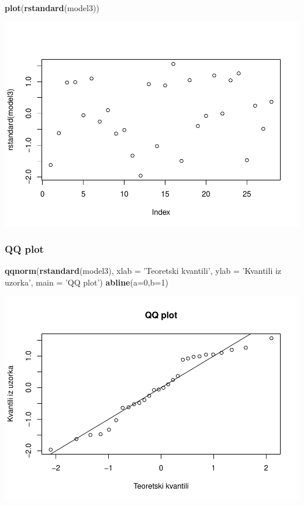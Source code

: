 \documentclass[]{article}
\newenvironment{Shaded}{\begin{snugshade}}{\end{snugshade}}
\newcommand{\KeywordTok}[1]{\textcolor[rgb]{0.13,0.29,0.53}{\textbf{{#1}}}}
\newcommand{\DataTypeTok}[1]{\textcolor[rgb]{0.13,0.29,0.53}{{#1}}}
\newcommand{\DecValTok}[1]{\textcolor[rgb]{0.00,0.00,0.81}{{#1}}}
\newcommand{\StringTok}[1]{\textcolor[rgb]{0.31,0.60,0.02}{{#1}}}
\newcommand{\NormalTok}[1]{{#1}}
\begin{document}
\begin{Shaded}
\begin{Highlighting}[]
\KeywordTok{plot}\NormalTok{(}\KeywordTok{rstandard}\NormalTok{(model3))}
\end{Highlighting}
\end{Shaded}

\includegraphics{Izvjestaj_files/figure-latex/unnamed-chunk-36-2.pdf}

\subsubsection{QQ plot}\label{qq-plot-3}

\begin{Shaded}
\begin{Highlighting}[]
\KeywordTok{qqnorm}\NormalTok{(}\KeywordTok{rstandard}\NormalTok{(model3), }\DataTypeTok{xlab =} \StringTok{'Teoretski kvantili'}\NormalTok{, }\DataTypeTok{ylab =} \StringTok{'Kvantili iz uzorka'}\NormalTok{,}
       \DataTypeTok{main =} \StringTok{'QQ plot'}\NormalTok{)}
\KeywordTok{abline}\NormalTok{(}\DataTypeTok{a=}\DecValTok{0}\NormalTok{,}\DataTypeTok{b=}\DecValTok{1}\NormalTok{)}
\end{Highlighting}
\end{Shaded}

\includegraphics{Izvjestaj_files/figure-latex/unnamed-chunk-37-1.pdf}
\end{document}
